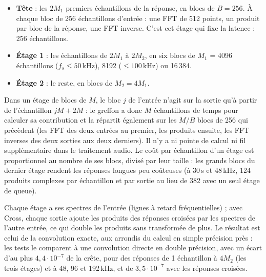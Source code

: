 \documentclass[a4paper,11pt]{article}
\begin{document}
\begin{itemize}
\item \textbf{Tête} : les $2M_1$ premiers échantillons de la réponse, en blocs de $B = 256$. À
  chaque bloc de 256 échantillons d'entrée : une FFT de 512 points, un produit par bloc de la
  réponse, une FFT inverse. C'est cet étage qui fixe la latence : 256 échantillons.
\item \textbf{Étage 1} : les échantillons de $2M_1$ à $2M_2$, en six blocs de $M_1$ = 4096
  échantillons ($f_s \leq 50$\,kHz), 8192 ($\leq 100$\,kHz) ou 16\,384.
\item \textbf{Étage 2} : le reste, en blocs de $M_2 = 4 M_1$.
\end{itemize}
Dans un étage de blocs de $M$, le bloc $j$ de l'entrée n'agit sur la sortie qu'à partir de
l'échantillon $jM + 2M$ : le greffon a donc $M$ échantillons de temps pour calculer sa
contribution et la répartit également sur les $M/B$ blocs de 256 qui précèdent (les FFT des deux
entrées au premier, les produits ensuite, les FFT inverses des deux sorties aux deux derniers). Il
n'y a ni pointe de calcul ni fil supplémentaire dans le traitement audio. Le coût par échantillon
d'un étage est proportionnel au nombre de ses blocs, divisé par leur taille : les grands blocs du
dernier étage rendent les réponses longues peu coûteuses (à 30\,s et 48\,kHz, 124 produits complexes
par échantillon et par sortie au lieu de 382 avec un seul étage de queue).

Chaque étage a ses spectres de l'entrée (lignes à retard fréquentielles) ; avec Cross, chaque
sortie ajoute les produits des réponses croisées par les spectres de l'autre entrée, ce qui double
les produits sans transformée de plus.
Le résultat est celui de la convolution exacte, aux arrondis du calcul en simple précision près :
les tests le comparent à une convolution directe en double précision, avec un écart d'au plus
$4{,}4 \cdot 10^{-7}$ de la crête, pour des réponses de 1 échantillon à $4M_2$ (les trois étages)
et à 48, 96 et 192\,kHz, et de $3{,}5 \cdot 10^{-7}$ avec les réponses croisées.
\end{document}
